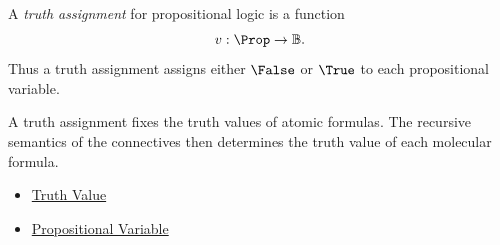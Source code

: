 \begin{tcolorbox}[colback=propbox, colframe=propborder, arc=2pt,
  left=6pt, right=6pt, top=4pt, bottom=4pt,
  title={\small\textbf{Definition (Truth Assignment)}},
  fonttitle=\small\bfseries]
\label{def:truth-assignment-propositional-logic}
A \emph{truth assignment} for propositional logic is a function
\[
v:\Prop\to\mathbb{B}.
\]
Thus a truth assignment assigns either $\False$ or $\True$ to each
propositional variable.
\end{tcolorbox}

\begin{remark*}[Interpretation]
A truth assignment fixes the truth values of atomic formulas. The recursive
semantics of the connectives then determines the truth value of each molecular
formula.
\end{remark*}

\begin{dependencies}
\begin{itemize}
  \item \hyperref[def:truth-value]{Truth Value}
  \item \hyperref[def:propositional-variable]{Propositional Variable}
\end{itemize}
\end{dependencies}
